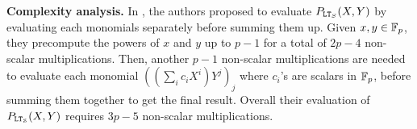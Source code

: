 
\textbf{Complexity analysis.}
In \cite{TLWRK20}, the authors proposed to evaluate $P_{\mathtt{LT}_S}(X,Y)$ by evaluating each monomials separately before summing them up. 
Given $x,y \in \mathbb{F}_p$, they precompute the powers of $x$ and $y$ up to $p-1$ for a total of $2p-4$ non-scalar multiplications. 
Then, another $p-1$ non-scalar multiplications are needed to evaluate each monomial $((\sum_i c_i X^i)Y^j)_{j}$ where $c_i$'s are scalars in $\mathbb{F}_p$, before summing them together to get the final result. 
Overall their evaluation of $P_{\mathtt{LT}_{\mathcal{S}}}(X,Y)$ requires $3p-5$ non-scalar multiplications.

